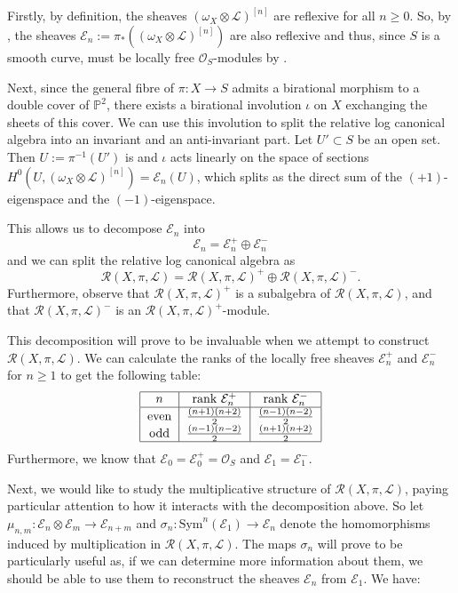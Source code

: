 \documentclass{amsart}
\begin{document}
Firstly, by definition, the sheaves $(\omega_X \otimes {\mathcal{L}})^{[n]}$ are reflexive for all $n \geq 0$. So, by \cite[Corollary 1.7]{srs}, the sheaves ${\mathcal{E}}_n := \pi_*((\omega_X \otimes {\mathcal{L}})^{[n]})$ are also reflexive and thus, since $S$ is a smooth curve, must be locally free ${\mathcal{O}}_S$-modules by \cite[Corollary 1.4]{srs}. 

Next, since the general fibre of $\pi\colon X \to S$ admits a birational morphism to a double cover of ${\mathbb{P}}^2$, there exists a birational involution $\iota$ on $X$ exchanging the sheets of this cover. We can use this involution to split the relative log canonical algebra into an invariant and an anti-invariant part. Let $U' \subset S$ be an open set. Then $U := \pi^{-1}(U')$ is  and $\iota$ acts linearly on the space of sections $H^0(U,(\omega_X \otimes {\mathcal{L}})^{[n]}) = {\mathcal{E}}_n(U)$, which splits as the direct sum of the $(+1)$-eigenspace and the $(-1)$-eigenspace. 

This allows us to decompose ${\mathcal{E}}_n$ into
\[{\mathcal{E}}_n = {\mathcal{E}}_n^+ \oplus {\mathcal{E}}_n^-\]
and we can split the relative log canonical algebra as
\[{\mathcal{R}}(X,\pi,{\mathcal{L}}) = {\mathcal{R}}(X,\pi,{\mathcal{L}})^+ \oplus {\mathcal{R}}(X,\pi,{\mathcal{L}})^-.\]
Furthermore, observe that ${\mathcal{R}}(X,\pi,{\mathcal{L}})^+$ is a subalgebra of ${\mathcal{R}}(X,\pi,{\mathcal{L}})$, and that ${\mathcal{R}}(X,\pi,{\mathcal{L}})^-$ is an ${\mathcal{R}}(X,\pi,{\mathcal{L}})^+$-module.

This decomposition will prove to be invaluable when we attempt to construct ${\mathcal{R}}(X,\pi,{\mathcal{L}})$. We can calculate the ranks of the locally free sheaves ${\mathcal{E}}_n^+$ and ${\mathcal{E}}_n^-$ for $n\geq 1$ to get the following table: 
\[   \begin{tabular}{|c|c|c|}  \hline 
$n$ & rank ${\mathcal{E}}_n^+$ &  rank ${\mathcal{E}}_n^-$ \\ \hline
even & $\frac{(n+1)(n+2)}{2}$ & $\frac{(n-1)(n-2)}{2}$\\
odd & $\frac{(n-1)(n-2)}{2}$ & $\frac{(n+1)(n+2)}{2}$ \\ \hline
\end{tabular}\]
Furthermore, we know that ${\mathcal{E}}_0 = {\mathcal{E}}_0^+ = {\mathcal{O}}_S$ and ${\mathcal{E}}_1 = {\mathcal{E}}_1^-$.

Next, we would like to study the multiplicative structure of ${\mathcal{R}}(X,\pi,{\mathcal{L}})$, paying particular attention to how it interacts with the decomposition above. So let $\mu_{n,m}\colon {\mathcal{E}}_n \otimes {\mathcal{E}}_m \to {\mathcal{E}}_{n+m}$ and $\sigma_n\colon {\mathrm{Sym}}^n({\mathcal{E}}_1) \to {\mathcal{E}}_n$ denote the homomorphisms induced by multiplication in ${\mathcal{R}}(X,\pi,{\mathcal{L}})$. The maps $\sigma_n$ will prove to be particularly useful as, if we can determine more information about them, we should be able to use them to reconstruct the sheaves ${\mathcal{E}}_n$ from ${\mathcal{E}}_1$. We have:
\end{document}
